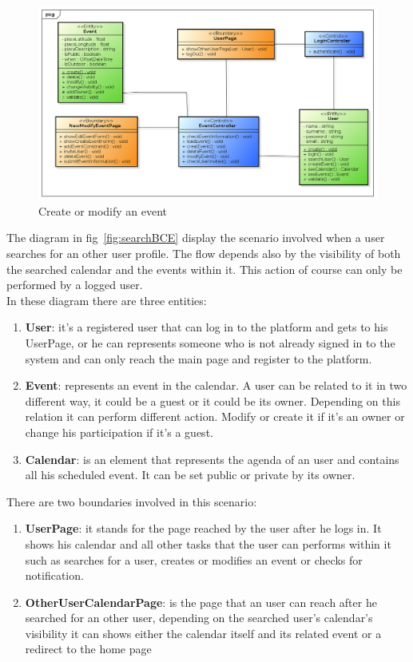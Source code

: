 \begin{center}
 \begin{figure}[H]
    \includegraphics[width=1\textwidth]{../BCEDiagram/BCE/EntityOverview/EventManagementBCE.png}
    \caption{Create or modify an event}
     \label{fig:editneweventBCE}
     \end{figure}
   \end{center}  
The diagram in fig~\ref{fig:searchBCE} display the scenario involved when a user searches for an other user profile. The flow depends also by the visibility of both the searched calendar and the events within it. This action of course can only be performed by a logged user.\\
In these diagram there are three entities:
\begin{enumerate}
\item {\bf User}: it's a registered user that can log in to the platform and gets to his UserPage, or he can represents someone who is not already signed in to the system and can only reach the main page and register to the platform.
\item {\bf Event}: represents an event in the calendar. A user can be related to it in two different way, it could be a guest or it could be its owner. Depending on this relation it can perform different action. Modify or create it if it's an owner or change his participation if it's a guest.
\item {\bf Calendar}: is an element that represents the agenda of an user and contains all his scheduled event. It can be set public or private by its owner.
\end{enumerate}
There are two boundaries involved in this scenario: \begin{enumerate}
\item {\bf UserPage}: it stands for the page reached by the user after he logs in. It shows his calendar and all other tasks that the user can performs within it such as searches for a user, creates or modifies an event or checks for notification.
 \item {\bf OtherUserCalendarPage}: is the page that an user can reach after he searched for an other user, depending on the searched user's calendar's visibility it can shows either the calendar itself and its related event or a redirect to the home page
 \end{enumerate}
